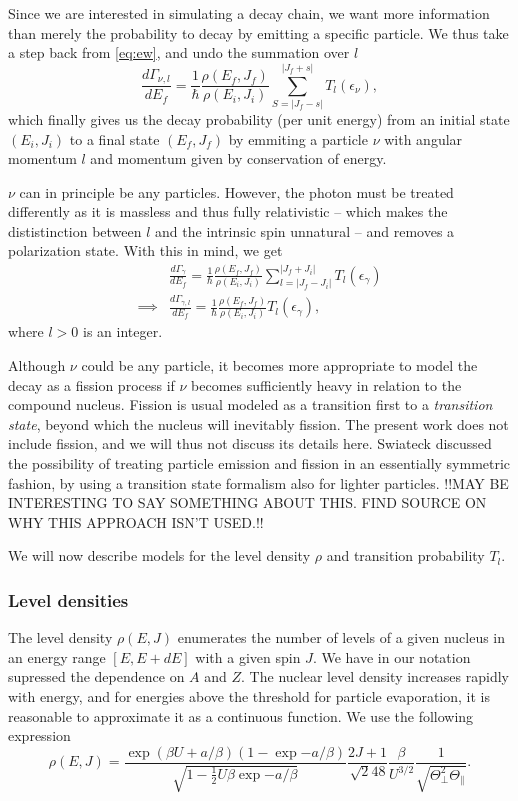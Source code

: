 Since we are interested in simulating a decay chain, we want more information than merely the probability to decay by emitting a specific particle. We thus take a step back from \eqref{eq:ew}, and undo the summation over $l$
\begin{equation}
\frac{d\Gamma_{\nu,l}}{dE_f} = \frac{1}{\hbar} \frac{\rho(E_f,J_f)}{\rho(E_i,J_i)} \sum_{S=|J_f-s|}^{|J_f+s|} T_l(\epsilon_\nu),\label{eq:ew}
\end{equation}
which finally gives us the decay probability (per unit energy) from an initial state $(E_i,J_i)$ to a final state $(E_f,J_f)$ by emmiting a particle $\nu$ with angular momentum $l$ and momentum given by conservation of energy.

$\nu$ can in principle be any particles. However, the photon must be treated differently as it is massless and thus fully relativistic -- which makes the dististinction between $l$ and the intrinsic spin unnatural -- and removes a polarization state. With this in mind, we get
\begin{align}
&\frac{d\Gamma_{\gamma}}{dE_f} = \frac{1}{\hbar} \frac{\rho(E_f,J_f)}{\rho(E_i,J_i)} \sum_{l=|J_f-J_i|}^{|J_f+J_i|} T_l(\epsilon_\gamma) \\
\implies & \frac{d\Gamma_{\gamma,l}}{dE_f} = \frac{1}{\hbar} \frac{\rho(E_f,J_f)}{\rho(E_i,J_i)} T_l(\epsilon_\gamma),
\end{align}
where $l>0$ is an integer.

Although $\nu$ could be any particle, it becomes more appropriate to model the decay as a fission process if $\nu$ becomes sufficiently heavy in relation to the compound nucleus. Fission is usual modeled as a transition first to a \emph{transition state}, beyond which the nucleus will inevitably fission\cite{krane:book}. The present work does not include fission, and we will thus not discuss its details here. Swiateck discussed the possibility of treating particle emission and fission in an essentially symmetric fashion, by using a transition state formalism also for lighter particles\cite{swiatecki:1983:art}. !!MAY BE INTERESTING TO SAY SOMETHING ABOUT THIS. FIND SOURCE ON WHY THIS APPROACH ISN'T USED.!!

We will now describe models for the level density $\rho$ and transition probability $T_l$.

\subsubsection{Level densities}
The level density $\rho(E,J)$ enumerates the number of levels of a given nucleus in an energy range $[E,E+dE]$ with a given spin $J$. We have in our notation supressed the dependence on $A$ and $Z$. The nuclear level density increases rapidly with energy, and for energies above the threshold for particle evaporation, it is reasonable to approximate it as a continuous function.
We use the following expression
\begin{equation}
\rho(E,J) = \frac{\exp{(\beta U + a/\beta)}(1-\exp{-a/\beta})}{\sqrt{1-\tfrac{1}{2}U\beta\exp{-a/\beta}}} \frac{2J+1}{\sqrt{2}48} \frac{\beta}{U^{3/2}} \frac{1}{\sqrt{\Theta_\perp^2 \Theta_\parallel}}.\label{eq:rho}
\end{equation}

